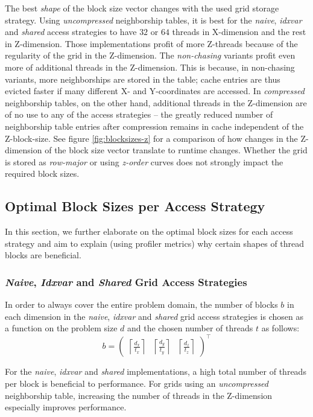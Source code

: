 The best \emph{shape} of the block size vector changes with the used grid storage strategy. Using \emph{uncompressed} neighborship tables, it is best for the \emph{naive}, \emph{idxvar} and \emph{shared} access strategies to have $32$ or $64$ threads in X-dimension and the rest in Z-dimension. Those implementations profit of more Z-threads because of the regularity of the grid in the Z-dimension. The \emph{non-chasing} variants profit even more of additional threads in the Z-dimension. This is because, in non-chasing variants, more neighborships are stored in the table; cache entries are thus evicted faster if many different X- and Y-coordinates are accessed. In \emph{compressed} neighborship tables, on the other hand, additional threads in the Z-dimension are of no use to any of the access strategies -- the greatly reduced number of neighborship table entries after compression remains in cache independent of the Z-block-size. See figure \ref{fig:blocksizes-z} for a comparison of how changes in the Z-dimension of the block size vector translate to runtime changes. Whether the grid is stored as \emph{row-major} or using \emph{z-order} curves does not strongly impact the required block sizes.

\subsection{Optimal Block Sizes per Access Strategy}

In this section, we further elaborate on the optimal block sizes for each access strategy and aim to explain (using profiler metrics) why certain shapes of thread blocks are beneficial.

\subsubsection{\emph{Naive}, \emph{Idxvar} and \emph{Shared} Grid Access Strategies}

In order to always cover the entire problem domain, the number of blocks $b$ in each dimension in the \emph{naive}, \emph{idxvar} and \emph{shared} grid access strategies is chosen as a function on the problem size $d$ and the chosen number of threads $t$ as follows:
$$b = \begin{pmatrix}\left\lceil\frac{d_x}{t_x}\right\rceil & \left\lceil\frac{d_y}{t_y}\right\rceil & \left\lceil\frac{d_z}{t_z}\right\rceil\end{pmatrix}^\top$$

For the \emph{naive}, \emph{idxvar} and \emph{shared} implementations, a high total number of threads per block is beneficial to performance. For grids using an \emph{uncompressed} neighborship table, increasing the number of threads in the Z-dimension especially improves performance.


